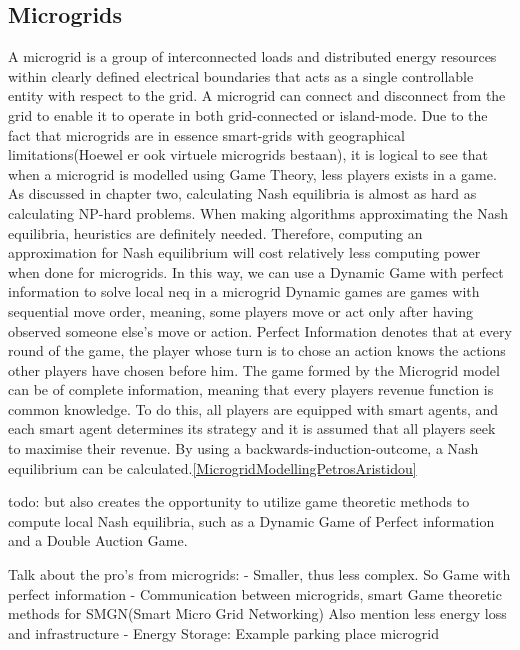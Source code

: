 \subsection{Microgrids}
A microgrid is a group of interconnected loads and distributed energy resources within clearly defined electrical boundaries that acts as a single controllable entity with respect to the grid. A microgrid can connect and disconnect from the grid to enable it to operate in both grid-connected or island-mode.
Due to the fact that microgrids are in essence smart-grids with geographical limitations(Hoewel er ook virtuele microgrids bestaan), it is logical to see that when a microgrid is modelled using Game Theory, less players exists in a game. As discussed in chapter two, calculating Nash equilibria is almost as hard as calculating NP-hard problems. When making algorithms approximating the Nash equilibria, heuristics are definitely needed. Therefore, computing an approximation for Nash equilibrium will cost relatively less computing power when done for microgrids. In this way, we can use a Dynamic Game with perfect information to solve local \ac{neq} in a microgrid
Dynamic games are games with sequential move order, meaning, some players move or act only after having observed someone else’s move or action. Perfect Information denotes that at every round of the game, the player whose turn is to chose an action knows the actions other players have chosen before him. The game formed by the Microgrid model can be of complete information, meaning that every players revenue function is common knowledge.
To do this, all players are equipped with smart agents, and each smart agent determines its strategy and it is assumed that all players seek to maximise their revenue. By using a backwards-induction-outcome, a Nash equilibrium can be calculated.\ref{MicrogridModellingPetrosAristidou}

todo: 
but also creates the opportunity to utilize game theoretic methods to compute local Nash equilibria, such as a Dynamic Game of Perfect information and a Double Auction Game.


Talk about the pro's from microgrids:
 - Smaller, thus less complex. So Game with perfect information
 - Communication between microgrids, smart Game theoretic methods for SMGN(Smart Micro Grid Networking) Also mention less energy loss and infrastructure
 - Energy Storage: Example parking place microgrid

